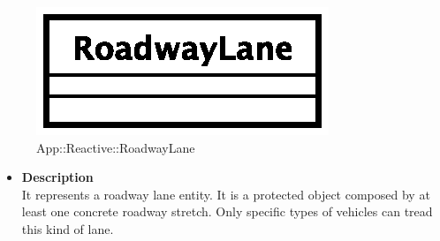 \begin{figure}[h]
\centering
\includegraphics[scale=0.6,keepaspectratio]{images/solution/roadway_lane.eps}
\caption{App::Reactive::RoadwayLane}
\label{fig:sd-app-roadway_lane}
\end{figure}
\FloatBarrier
\begin{itemize}
  \item \textbf{Description} \\
    It represents a roadway lane entity. It is a protected object composed by at least
one concrete roadway stretch. Only specific types of vehicles can tread this kind of lane. 
\end{itemize}
